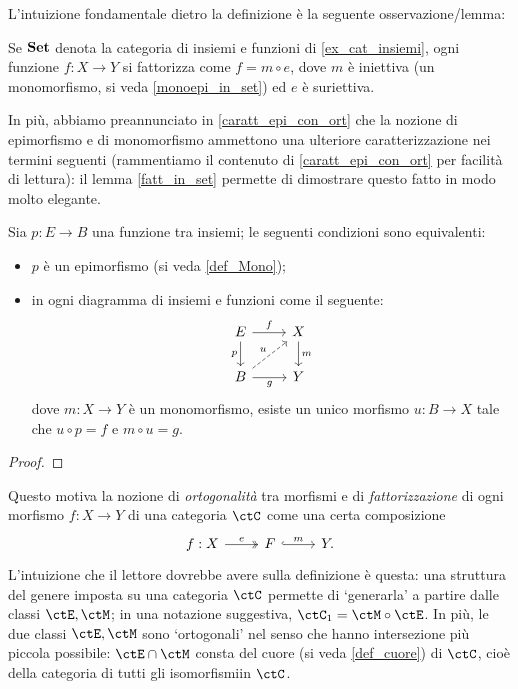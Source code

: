 \medskip
L'intuizione fondamentale dietro la definizione è la seguente osservazione/lemma:
\begin{lemma}\label{fatt_in_set}
	Se \(\mathbf{Set}\) denota la categoria di insiemi e funzioni di \ref{ex_cat_insiemi}, ogni funzione \(f : X \to Y\) si fattorizza come \(f = m \circ e\), dove \(m\) è iniettiva (un monomorfismo, si veda \ref{monoepi_in_set}) ed \(e\) è suriettiva.%
\end{lemma}
In più, abbiamo preannunciato in \ref{caratt_epi_con_ort} che la nozione di epimorfismo e di monomorfismo ammettono una ulteriore caratterizzazione nei termini seguenti (rammentiamo il contenuto di \ref{caratt_epi_con_ort} per facilità di lettura): il lemma \ref{fatt_in_set} permette di dimostrare questo fatto in modo molto elegante.
\begin{proposition*}
	Sia \(p : E \to B\) una funzione tra insiemi; le seguenti condizioni sono equivalenti:
	\begin{itemize}
		\item \(p\) è un epimorfismo (si veda \ref{def_Mono});
		\item in ogni diagramma di insiemi e funzioni come il seguente:
		      \[\begin{tikzcd}
				      E \ar[r, "f"]\ar[d, "p"']& X \ar[d, "m"]\\
				      B \ar[r, "g"'] \ar[ur, dashed, "u"]& Y
			      \end{tikzcd}\]
		      dove \(m : X\to Y\) è un monomorfismo, esiste un unico morfismo \(u : B\to X\) tale che \(u\circ p = f\) e \(m\circ u = g\).
	\end{itemize}
\end{proposition*}
\begin{proof}
	\Todo{}
\end{proof}

Questo motiva la nozione di \emph{ortogonalità} tra morfismi e di \emph{fattorizzazione} di ogni morfismo \(f : X\to Y\) di una categoria \(\ctC\) come una certa composizione
\[
	\begin{tikzcd}
		f : X \ar[r, "e", two heads]& F \ar[r, "m", hook] & Y.
	\end{tikzcd}
\]
L'intuizione che il lettore dovrebbe avere sulla definizione è questa: una struttura del genere imposta su una categoria \(\ctC\) permette di `generarla' a partire dalle classi \(\ctE,\ctM\); in una notazione suggestiva, \(\ctC_1 = \ctM\circ \ctE\). In più, le due classi \(\ctE,\ctM\) sono `ortogonali' nel senso che hanno intersezione più piccola possibile: \(\ctE\cap \ctM\) consta del cuore (si veda \ref{def_cuore}) di \(\ctC\), cioè della categoria di tutti gli isomorfismiin \(\ctC\).

